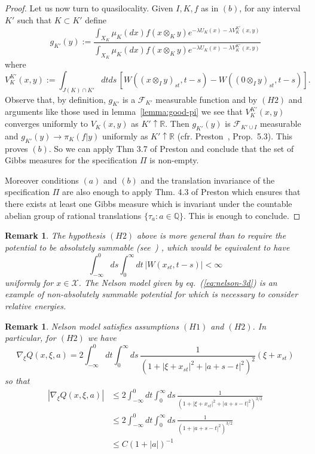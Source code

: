 \documentclass[a4paper,12pt,reqno]{amsart}
\newtheorem{remark}[theorem]{Remark}
\newcommand{\R}{\mathbb{R}}
\newcommand{\X}{\mathcal{X}}
\newcommand{\F}{\mathcal{F}}
\begin{document}
\begin{proof}
Let us now turn to quasilocality.
Given $I,K,f$ as in $(b)$, for any interval $K'$ such that $K \subset K'$ define
$$
g_{K'}(y) := \frac{\int_{X_K} \mu_K(dx) f(x \otimes_K y) e^{-\lambda U_K(x) -\lambda V_{K}^{K'}(x,y)} }{
\int_{X_K} \mu_K(dx) f(x \otimes_K y) e^{-\lambda U_K(x) -\lambda V_{K}^{K'}(x,y)}}
$$
where
\begin{equation}
\label{eq:V-approx}
V_K^{K'}(x,y) := \int_{J(K)\cap K'} dt ds \, [W((x \otimes_I y)_{st},t-s)-W((0 \otimes_I y)_{st},t-s)].  
\end{equation}
Observe that, by definition, $g_{K'}$ is a $\F_{K'}$ measurable function and by $(H2)$ and arguments like those used in lemma~\ref{lemma:good-pi} we see that $V_{K}^{K'}(x,y)$ converges uniformly to $V_K(x,y)$ as $K' \uparrow \R$. Then $g_{K'}(y)$ is $\F_{K' \cup I}$ measurable and $g_{K'}(y) \to \pi_K(f|y)$ uniformly as $K' \uparrow \R$ (cfr. Preston~\cite{Preston}, Prop.~5.3). This proves $(b)$. 
So we can apply Thm 3.7 of Preston and conclude that the set of Gibbs measures for the specification $\Pi$ is non-empty.

Moreover conditions $(a)$ and $(b)$ and the translation invariance of the specification $\Pi$ are also enough to apply Thm. 4.3 of Preston which ensures that there exists at least one Gibbs measure which is invariant under the countable abelian group of rational translations $\{\tau_a : a \in \mathbb{Q}\}$. This is enough to conclude.
\end{proof}




\begin{remark}
The hypothesis $(H2)$ above is more general than to require the potential to
be \emph{absolutely summable} (see~\cite{Georgii})
, which would be equivalent to have
$$
\int_{-\infty}^{0}ds  \int_{0}^{\infty} dt\, |W(x_{st},t-s)| < \infty
$$  
uniformly for $x \in \X$. The Nelson model given by eq.~(\ref{eq:nelson-3d}) is an example of non-absolutely summable potential for which is necessary to consider relative energies.
\end{remark}


\begin{remark}
Nelson model
 satisfies assumptions $(H1)$ and $(H2)$. In particular,
for $(H2)$  we have
\begin{equation}
\nabla_\xi Q(x,\xi,a) =  2 \int_{-\infty}^0 dt \int_{0}^\infty ds \,
 \frac{1}{(1+|\xi+x_{st}|^2+|a+s-t|^2)^2} (\xi+x_{st})
\end{equation}
so that
\begin{equation}
  \begin{split}
|\nabla_\xi Q(x,\xi,a)| & \le  2 \int_{-\infty}^0 dt \int_{0}^\infty ds \,
 \frac{1}{(1+|\xi+x_{st}|^2+|a+s-t|^2)^{3/2}} 
\\ & \le  2 \int_{-\infty}^0 dt \int_{0}^\infty ds \,
 \frac{1}{(1+|a+s-t|^2)^{3/2}}     
\\ & \le  C (1+|a|)^{-1}
  \end{split}
\end{equation}

\end{remark}
\end{document}
